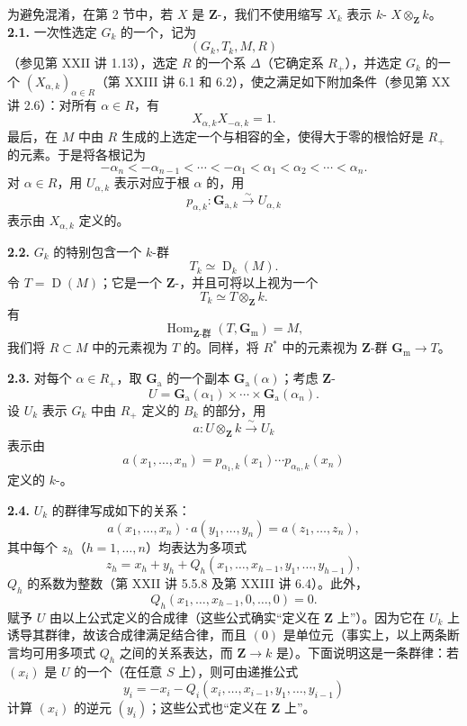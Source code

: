 为避免混淆，在第 2 节中，若 $X$ 是 $\mathbf Z$-，我们不使用缩写 $X_k$ 表示 $k$- $X\otimes_{\mathbf Z}k$。
\textbf{2.1.} 一次性选定 $G_k$ 的一个，记为
\[(G_k,T_k,M,R)\]
（参见第 XXII 讲 1.13），选定 $R$ 的一个系 $\Delta$（它确定系 $R_+$），并选定 $G_k$ 的一个  $(X_{\alpha,k})_{\alpha\in R}$（第 XXIII 讲 6.1 和 6.2），使之满足如下附加条件（参见第 XX 讲 2.6）：对所有 $\alpha\in R$，有
\[X_{\alpha,k}X_{-\alpha,k}=1.\]
最后，在 $M$ 中由 $R$ 生成的上选定一个与相容的全，使得大于零的根恰好是 $R_+$ 的元素。于是将各根记为
\[-\alpha_n<-\alpha_{n-1}<\cdots<-\alpha_1<\alpha_1<\alpha_2<\cdots<\alpha_n.\]
对 $\alpha\in R$，用 $U_{\alpha,k}$ 表示对应于根 $\alpha$ 的，用
\[p_{\alpha,k}:\mathbf G_{\mathrm a,k}\xrightarrow{\sim}U_{\alpha,k}\]
表示由 $X_{\alpha,k}$ 定义的。

\textbf{2.2.} $G_k$ 的特别包含一个 $k$-群
\[T_k\simeq\operatorname D_k(M).\]
令 $T=\operatorname D(M)$；它是一个 $\mathbf Z$-，并且可将以上视为一个
\[T_k\simeq T\otimes_{\mathbf Z}k.\]
有
\[\operatorname{Hom}_{\mathbf Z\text{-群}}(T,\mathbf G_{\mathrm m})=M,\]
我们将 $R\subset M$ 中的元素视为 $T$ 的。同样，将 $R^*$ 中的元素视为 $\mathbf Z$-群 $\mathbf G_{\mathrm m}\to T$。

\textbf{2.3.} 对每个 $\alpha\in R_+$，取 $\mathbf G_{\mathrm a}$ 的一个副本 $\mathbf G_{\mathrm a}(\alpha)$；考虑 $\mathbf Z$-
\[U=\mathbf G_{\mathrm a}(\alpha_1)\times\cdots\times\mathbf G_{\mathrm a}(\alpha_n).\]
设 $U_k$ 表示 $G_k$ 中由 $R_+$ 定义的  $B_k$ 的部分，用
\[a:U\otimes_{\mathbf Z}k\xrightarrow{\sim}U_k\]
表示由
\[a(x_1,\ldots,x_n)=p_{\alpha_1,k}(x_1)\cdots p_{\alpha_n,k}(x_n)\]
定义的 $k$-。

\textbf{2.4.} $U_k$ 的群律写成如下的关系：
\[a(x_1,\ldots,x_n)\cdot a(y_1,\ldots,y_n)=a(z_1,\ldots,z_n),\]
其中每个 $z_h$（$h=1,\ldots,n$）均表达为多项式
\[z_h=x_h+y_h+Q_h(x_1,\ldots,x_{h-1},y_1,\ldots,y_{h-1}),\]
$Q_h$ 的系数为整数（第 XXII 讲 5.5.8 及第 XXIII 讲 6.4）。此外，
\[Q_h(x_1,\ldots,x_{h-1},0,\ldots,0)=0.\]
赋予 $U$ 由以上公式定义的合成律（这些公式确实“定义在 $\mathbf Z$ 上”）。因为它在 $U_k$ 上诱导其群律，故该合成律满足结合律，而且 $(0)$ 是单位元（事实上，以上两条断言均可用多项式 $Q_h$ 之间的关系表达，而 $\mathbf Z\to k$ 是）。下面说明这是一条群律：若 $(x_i)$ 是 $U$ 的一个（在任意 $S$ 上），则可由递推公式
\[y_i=-x_i-Q_i(x_i,\ldots,x_{i-1},y_1,\ldots,y_{i-1})\]
计算 $(x_i)$ 的逆元 $(y_i)$；这些公式也“定义在 $\mathbf Z$ 上”。

